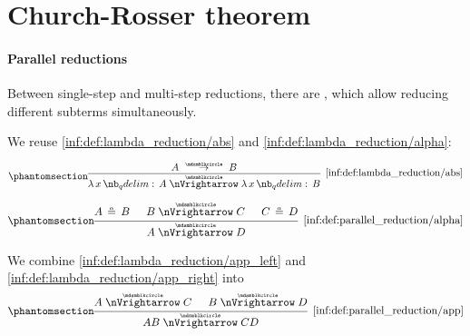 \section{Church-Rosser theorem}\label{sec:church_rosser_theorem}

\paragraph{Parallel reductions}

\begin{definition}\label{def:parallel_reduction}
  Between single-step and multi-step reductions, there are , which allow reducing different subterms simultaneously.

  \begin{thmenum}
     We reuse \ref{inf:def:lambda_reduction/abs} and \ref{inf:def:lambda_reduction/alpha}:
    \begin{paracol}{2}
      \begin{leftcolumn}
        \begin{equation*}\taglabel[\ensuremath{ \logic{ParAbs}_{\Anon} }]{inf:def:parallel_reduction/abs}
          \begin{prooftree}
            \hypo{ A \pred B }
            \infer1[\ref{inf:def:lambda_reduction/abs}]{ \qabs x A \ppred \qabs x B }
          \end{prooftree}
        \end{equation*}
      \end{leftcolumn}

      \begin{rightcolumn}
        \begin{equation*}\taglabel[\ensuremath{ \logic{ParAlpha}_{\Anon} }]{inf:def:parallel_reduction/alpha}
          \begin{prooftree}
            \hypo{ A \aequiv B }
            \hypo{ B \ppred C }
            \hypo{ C \aequiv D }
            \infer3[\ref{inf:def:parallel_reduction/alpha}]{ A \ppred D }.
          \end{prooftree}
        \end{equation*}
      \end{rightcolumn}
    \end{paracol}

    We combine \ref{inf:def:lambda_reduction/app_left} and \ref{inf:def:lambda_reduction/app_right} into
    \begin{equation*}\taglabel[\ensuremath{ \logic{ParApp}_{\Anon} }]{inf:def:parallel_reduction/app}
      \begin{prooftree}
        \hypo{ A \ppred C }
        \hypo{ B \ppred D }
        \infer2[\ref{inf:def:parallel_reduction/app}]{ AB \ppred CD }
      \end{prooftree}
    \end{equation*}


\end{thmenum}
\end{definition}
